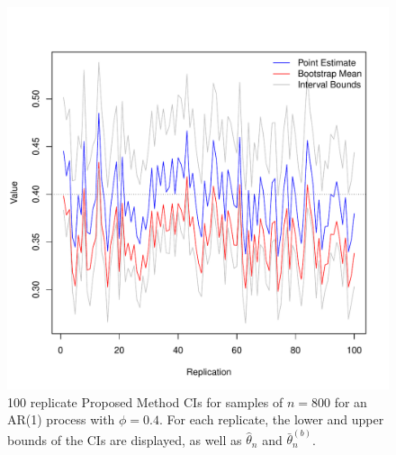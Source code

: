\documentclass[12pt, letterpaper, titlepage]{article}
\begin{document}
\begin{figure}[tbp]
  \centering
  \includegraphics[width=\textwidth]{figures/prop}
  \caption{100 replicate Proposed Method CIs for samples of $n = 800$ for
  an AR(1) process with $\phi = 0.4$. For each replicate, the lower and upper bounds of the CIs are displayed, as well as $\hat\theta_n$ and $\bar\theta_n^{(b)}$.}
  \label{fig:prop}
\end{figure}
\end{document}
